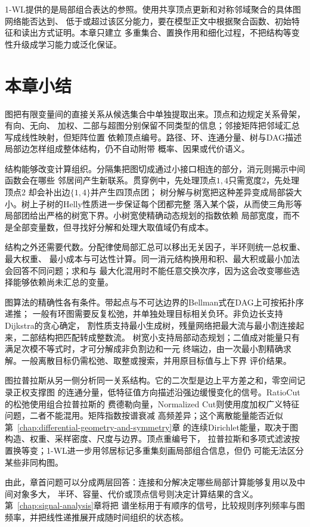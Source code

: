 1-WL提供的是局部组合表达的参照。使用共享顶点更新和对称邻域聚合的具体图网络能否达到、
低于或超过该区分能力，要在模型正文中根据聚合函数、初始特征和读出方式证明。本章只建立
多重集合、置换作用和细化过程，不把结构等变性升级成学习能力或泛化保证。

\section{本章小结}
\label{sec:graph-theory-summary}

图把有限变量间的直接关系从候选集合中单独提取出来。顶点和边规定关系骨架，有向、无向、
加权、二部与超图分别保留不同类型的信息；邻接矩阵把邻域汇总写成线性映射，但矩阵位置
依赖顶点编号。路径、环、连通分量、树与DAG描述局部边怎样组成整体结构，仍不自动附带
概率、因果或代价语义。

结构能够改变计算组织。分隔集把图切成通过小接口相连的部分，消元则揭示中间函数会在哪些
邻居间产生新联系。贯穿例中，先处理顶点\(1,4\)只需宽度\(2\)，先处理顶点\(2\)
却会补出边\(\{1,4\}\)并产生四顶点团；
树分解与树宽把这种差异变成局部袋大小。树上子树的Helly性质进一步保证每个团都完整
落入某个袋，从而使三角形等局部团给出严格的树宽下界。小树宽使精确动态规划的指数依赖
局部宽度，而不是全部变量数，但寻找好分解和处理大取值域仍有成本。

结构之外还需要代数。分配律使局部汇总可以移出无关因子，半环则统一总权重、最大权重、
最小成本与可达性计算。同一消元结构换用和积、最大积或最小加法会回答不同问题；求和与
最大化混用时不能任意交换次序，因为这会改变哪些选择能够依赖尚未汇总的变量。

图算法的精确性各有条件。带起点与不可达边界的Bellman式在DAG上可按拓扑序递推；
一般有环图需要反复松弛，并单独处理目标相关负环。非负边长支持Dijkstra的贪心确定，
割性质支持最小生成树，残量网络把最大流与最小割连接起来，二部结构把匹配转成整数流。
树宽小支持局部动态规划；二值成对能量只有满足次模不等式时，才可分解成非负割边和一元
终端边，由一次最小割精确求解。一般离散目标仍需松弛、取整或搜索，并用原目标值与上下界
评价结果。

图拉普拉斯从另一侧分析同一关系结构。它的二次型是边上平方差之和，零空间记录正权支撑图
的连通分量，低特征值方向描述沿强边缓慢变化的信号。RatioCut的松弛使用组合拉普拉斯的
费德勒向量，Normalized Cut则使用度加权广义特征问题，二者不能混用。矩阵指数按谱衰减
高频差异；这个离散能量能否近似第~\ref{chap:differential-geometry-and-symmetry}章
的连续Dirichlet能量，取决于图构造、权重、采样密度、尺度与边界。顶点重编号下，
拉普拉斯和多项式滤波按置换等变；1-WL进一步用邻居标记多重集刻画局部组合信息，但仍
可能无法区分某些非同构图。

由此，章首问题可以分成两层回答：连接和分解决定哪些局部计算能够复用以及中间对象多大，
半环、容量、代价或顶点信号则决定计算结果的含义。第~\ref{chap:signal-analysis}章将把
谱坐标用于有顺序的信号，比较规则序列频率与图频率，并把线性递推展开成随时间组织的状态核。
